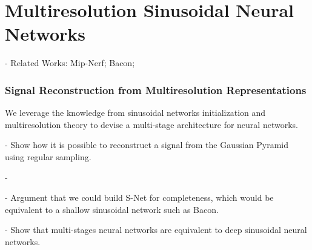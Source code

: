 \chapter{Multiresolution Sinusoidal Neural Networks}
\label{ch:mrnet}

- Related Works: Mip-Nerf; Bacon; 

\subsection{Signal Reconstruction from Multiresolution Representations }

We leverage the knowledge from sinusoidal networks initialization and multiresolution theory to devise a multi-stage architecture for neural networks. 

- Show how it is possible to reconstruct a signal from the Gaussian Pyramid using regular sampling.

- 

- Argument that we could build S-Net for completeness, which would be equivalent to a shallow sinusoidal network such as Bacon.

- Show that multi-stages neural networks are equivalent to deep sinusoidal neural networks.



